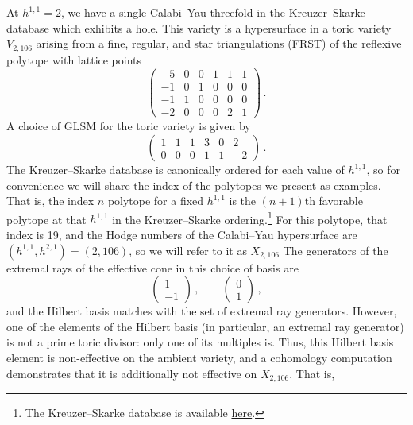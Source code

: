 \documentclass[11pt,dvipsnames]{article}
\theoremstyle{definition}
\begin{document}
At $h^{1,1}=2$, we have a single Calabi--Yau threefold in the Kreuzer--Skarke database which exhibits a hole. This variety is a hypersurface in a toric variety $V_{2,106}$ arising from a fine, regular, and star triangulations (FRST) of the reflexive polytope with lattice points
\begin{equation}
\begin{pmatrix}
-5 & 0 & 0 & 1 & 1 & 1 \\
-1 & 0 & 1 & 0 & 0 & 0 \\
-1 & 1 & 0 & 0 & 0 & 0 \\
-2 & 0 & 0 & 0 & 2 & 1
\end{pmatrix}\,.
\end{equation}
A choice of GLSM for the toric variety is given by
\begin{equation}
\label{eq:X2106 GLSM}
\begin{pmatrix}
    1&1&1&3&0&2\\
    0&0&0&1&1&-2
\end{pmatrix}\,.
\end{equation}
The Kreuzer--Skarke database is canonically ordered for each value of $h^{1,1}$, so for convenience we will share the index of the polytopes we present as examples. That is, the index $n$ polytope for a fixed $h^{1,1}$ is the $(n+1)$th favorable polytope at that $h^{1,1}$ in the Kreuzer--Skarke ordering.\footnote{The Kreuzer--Skarke database is available \href{http://hep.itp.tuwien.ac.at/~kreuzer/CY/}{here}.} For this polytope, that index is 19, and the Hodge numbers of the Calabi--Yau hypersurface are $(h^{1,1},h^{2,1})=(2,106)$, so we will refer to it as $X_{2,106}$
The generators of the extremal rays of the effective cone in this choice of basis are
\begin{equation}
\begin{pmatrix}
    1\\
    -1
\end{pmatrix}\,,
\qquad \begin{pmatrix}
    0\\
    1
\end{pmatrix}\,,
\end{equation}
and the Hilbert basis matches with the set of extremal ray generators. However, one of the elements of the Hilbert basis (in particular, an extremal ray generator) is not a prime toric divisor: only one of its multiples is. Thus, this Hilbert basis element is non-effective on the ambient variety, and a cohomology computation demonstrates that it is additionally not effective on $X_{2,106}$. That is,
\end{document}
